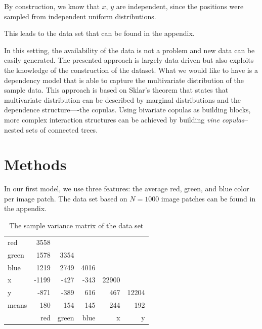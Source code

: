 \documentclass{article}
\begin{document}
By construction, we know that $x$, $y$ are independent, since the
positions were sampled from independent uniform distributions.

This leads to the data set that can be found in the appendix.



In this setting, the availability of the data is not a problem and new
data can be easily generated. The presented approach is largely
data-driven but also exploits the knowledge of the construction of the
dataset. What we would like to have is a dependency model that is able
to capture the multivariate distribution of the sample data. This
approach is based on Sklar's theorem that states that multivariate
distribution can be described by marginal distributions and the
dependence structure----the copulas. Using bivariate copulas as
building blocks, more complex interaction structures can be achieved
by building \emph{vine copulas}--nested sets of connected trees.

\section{Methods}

In our first model, we use three features: the average red, green, and
blue color per image patch. The data set based on $N = 1000$ image
patches can be found in the appendix.

\begin{table}[h]
  \centering
  \begin{tabular}{l|rrrrr}
    red   & 3558  &       &      &       &       \\
    green & 1578  & 3354  &      &       &       \\
    blue  & 1219  & 2749  & 4016 &       &       \\
    x     & -1199 & -427  & -343 & 22900 &       \\
    y     & -871  & -389  & 616  & 467   & 12204 \\
    \midrule
    means & 180   & 154   & 145  & 244   & 192   \\
    \midrule
          & red   & green & blue & x     & y
  \end{tabular}
  \caption{The sample variance matrix of the data set}
\end{table}
\end{document}
